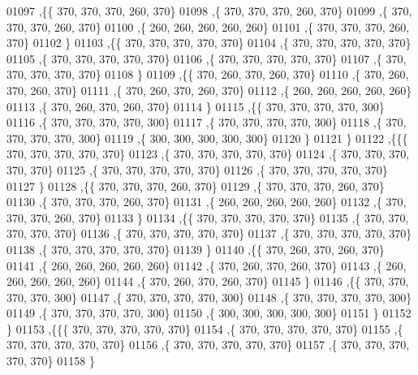 \begin{DoxyCode}
01097   ,\{\{   370,   370,   370,   260,   370\}
01098    ,\{   370,   370,   370,   260,   370\}
01099    ,\{   370,   370,   370,   260,   370\}
01100    ,\{   260,   260,   260,   260,   260\}
01101    ,\{   370,   370,   370,   260,   370\}
01102    \}
01103   ,\{\{   370,   370,   370,   370,   370\}
01104    ,\{   370,   370,   370,   370,   370\}
01105    ,\{   370,   370,   370,   370,   370\}
01106    ,\{   370,   370,   370,   370,   370\}
01107    ,\{   370,   370,   370,   370,   370\}
01108    \}
01109   ,\{\{   370,   260,   370,   260,   370\}
01110    ,\{   370,   260,   370,   260,   370\}
01111    ,\{   370,   260,   370,   260,   370\}
01112    ,\{   260,   260,   260,   260,   260\}
01113    ,\{   370,   260,   370,   260,   370\}
01114    \}
01115   ,\{\{   370,   370,   370,   370,   300\}
01116    ,\{   370,   370,   370,   370,   300\}
01117    ,\{   370,   370,   370,   370,   300\}
01118    ,\{   370,   370,   370,   370,   300\}
01119    ,\{   300,   300,   300,   300,   300\}
01120    \}
01121   \}
01122  ,\{\{\{   370,   370,   370,   370,   370\}
01123    ,\{   370,   370,   370,   370,   370\}
01124    ,\{   370,   370,   370,   370,   370\}
01125    ,\{   370,   370,   370,   370,   370\}
01126    ,\{   370,   370,   370,   370,   370\}
01127    \}
01128   ,\{\{   370,   370,   370,   260,   370\}
01129    ,\{   370,   370,   370,   260,   370\}
01130    ,\{   370,   370,   370,   260,   370\}
01131    ,\{   260,   260,   260,   260,   260\}
01132    ,\{   370,   370,   370,   260,   370\}
01133    \}
01134   ,\{\{   370,   370,   370,   370,   370\}
01135    ,\{   370,   370,   370,   370,   370\}
01136    ,\{   370,   370,   370,   370,   370\}
01137    ,\{   370,   370,   370,   370,   370\}
01138    ,\{   370,   370,   370,   370,   370\}
01139    \}
01140   ,\{\{   370,   260,   370,   260,   370\}
01141    ,\{   260,   260,   260,   260,   260\}
01142    ,\{   370,   260,   370,   260,   370\}
01143    ,\{   260,   260,   260,   260,   260\}
01144    ,\{   370,   260,   370,   260,   370\}
01145    \}
01146   ,\{\{   370,   370,   370,   370,   300\}
01147    ,\{   370,   370,   370,   370,   300\}
01148    ,\{   370,   370,   370,   370,   300\}
01149    ,\{   370,   370,   370,   370,   300\}
01150    ,\{   300,   300,   300,   300,   300\}
01151    \}
01152   \}
01153  ,\{\{\{   370,   370,   370,   370,   370\}
01154    ,\{   370,   370,   370,   370,   370\}
01155    ,\{   370,   370,   370,   370,   370\}
01156    ,\{   370,   370,   370,   370,   370\}
01157    ,\{   370,   370,   370,   370,   370\}
01158    \}

\end{DoxyCode}
